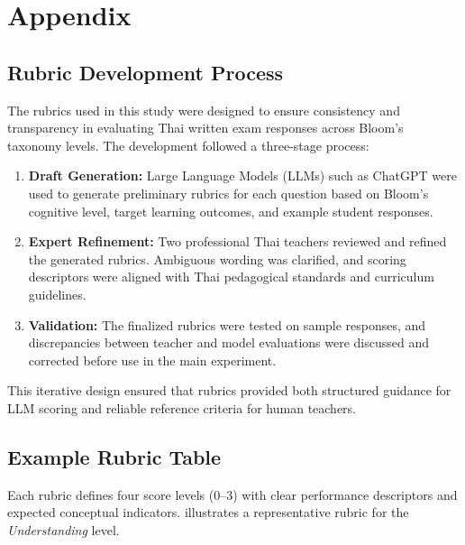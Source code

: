\chapter{Appendix \thechapter}\label{appendixA}
      
\section{Rubric Development Process}

The rubrics used in this study were designed to ensure 
consistency and transparency in evaluating Thai written exam 
responses across Bloom’s taxonomy levels. The development 
followed a three-stage process:

\begin{enumerate}
    \item \textbf{Draft Generation:} Large Language Models (LLMs) such as ChatGPT were used to generate preliminary rubrics for each question based on Bloom’s cognitive level, target learning outcomes, and example student responses.
    \item \textbf{Expert Refinement:} Two professional Thai teachers reviewed and refined the generated rubrics. Ambiguous wording was clarified, and scoring descriptors were aligned with Thai pedagogical standards and curriculum guidelines.
    \item \textbf{Validation:} The finalized rubrics were tested on sample responses, and discrepancies between teacher and model evaluations were discussed and corrected before use in the main experiment.
\end{enumerate}

This iterative design ensured that rubrics provided both 
structured guidance for LLM scoring and reliable reference 
criteria for human teachers.


\section{Example Rubric Table}

Each rubric defines four score levels (0–3) with clear 
performance descriptors and expected conceptual indicators. 
 illustrates a 
representative rubric for the \textit{Understanding} level.

